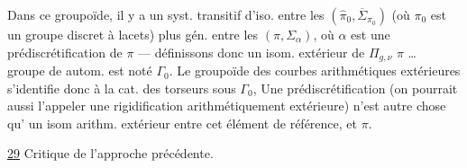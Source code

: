 

Dans ce groupoïde, il y a un syst. transitif d'iso. entre les  $(\widehat{\pi}_0,\overline{\Sigma}_{\pi_0})$ (où $\pi_0$ est un groupe discret à lacets) plus gén. entre les $(\pi,\Sigma_\alpha)$, où $\alpha$  est une prédiscrétification de $\pi$ --- définissons donc un isom.  extérieur de $\Pi_{g,\nu}$
$\pi$ \ldots\  groupe de  autom. est noté $\Gamma_0$. Le  groupoïde des courbes  arithmétiques extérieures s'identifie donc à la cat. des torseurs sous $\Gamma_0$,
Une prédiscrétification (on pourrait aussi l'appeler une rigidification arithmétiquement extérieure) n'est  autre chose qu' un isom arithm. extérieur entre cet élément de référence, et $\pi$.


\uline{29} Critique de l'approche précédente.

